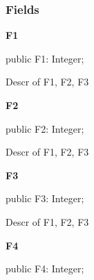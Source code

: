 \documentclass{report}
\newif\ifpdf
\begin{document}
\subsubsection*{\large{\textbf{Fields}}\normalsize\hspace{1ex}\hfill}
\begin{list}{}{
\setlength{\itemindent}{0cm}
\setlength{\listparindent}{0cm}
\setlength{\leftmargin}{\evensidemargin}
\addtolength{\leftmargin}{\tmplength}
\settowidth{\labelsep}{X}
\addtolength{\leftmargin}{\labelsep}
\setlength{\labelwidth}{\tmplength}
}
\label{ok_multiple_fields.TRec1-F1}
\item[\textbf{F1}\hfill]
\ifpdf
\begin{flushleft}
\fi
\begin{ttfamily}
public F1: Integer;\end{ttfamily}

\ifpdf
\end{flushleft}
\fi


\par Descr of F1, F2, F3\label{ok_multiple_fields.TRec1-F2}
\item[\textbf{F2}\hfill]
\ifpdf
\begin{flushleft}
\fi
\begin{ttfamily}
public F2: Integer;\end{ttfamily}

\ifpdf
\end{flushleft}
\fi


\par Descr of F1, F2, F3\label{ok_multiple_fields.TRec1-F3}
\item[\textbf{F3}\hfill]
\ifpdf
\begin{flushleft}
\fi
\begin{ttfamily}
public F3: Integer;\end{ttfamily}

\ifpdf
\end{flushleft}
\fi


\par Descr of F1, F2, F3\label{ok_multiple_fields.TRec1-F4}
\item[\textbf{F4}\hfill]
\ifpdf
\begin{flushleft}
\fi
\begin{ttfamily}
public F4: Integer;\end{ttfamily}

\ifpdf
\end{flushleft}
\fi



\end{list}
\end{document}

